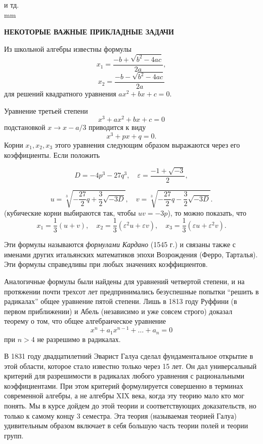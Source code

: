 \documentclass[12pt,english,russian]{article}
\begin{document}
	и тд. \\
	
	 mm
	
	\begin{center}
			{\large {\bf НЕКОТОРЫЕ ВАЖНЫЕ ПРИКЛАДНЫЕ ЗАДАЧИ}  }
		\end{center}
	
	Из школьной алгебры известны формулы
	$$x_1=\frac{-b+\sqrt{b^2-4ac}}{2a},$$
	$$x_2=\frac{-b-\sqrt{b^2-4ac}}{2a}$$ 
	для решений квадратного уравнения $ax^2+bx+c=0$.
	
	Уравнение третьей степени
	$$x^3+ax^2+bx+c=0$$
	подстановкой $x \to x-a/3$ приводится к виду
	$$x^3+px+q=0.$$
	Корни $x_1, x_2, x_3$
	этого уравнения следующим образом выражаются 
	через его коэффициенты. Если положить
	
	$$
		D=-4p^3-27q^3, \quad \varepsilon=\frac{-1+\sqrt{-3}}{2},
	$$
	
	$$
		u=\sqrt[3]{-\frac{27}{2}q+\frac{3}{2}\sqrt{-3D}}, \quad v=\sqrt[3]{-\frac{27}{2}q-\frac{3}{2}\sqrt{-3D}}.
	$$
	(кубические корни выбираются так, чтобы $uv=-3p$), то можно
	показать, что
	$$x_1=\frac{1}{3}(u+v), \quad x_2=\frac{1}{3}(\varepsilon^2u+\varepsilon v), \quad x_3=\frac{1}{3}(\varepsilon u+\varepsilon^2v).$$
	
	Эти формулы называются
	\textit{формулами Кардано}
	(1545 г.) и связаны 
	также с именами других итальянских математиков эпохи
	Возрождения (Ферро, Тарталья). Эти формулы 
	справедливы при
	любых значениях коэффициентов.
	
	Аналогичные формулы были найдены для уравнений четвертой 
	степени, и на протяжении почти трехсот лет предпринимались 
	безуспешные попытки “решить в радикалах” общее уравнение 
	пятой степени. Лишь в 1813 году Руффини (в первом приближении) и Абель (независимо и уже совсем строго) доказал
	теорему о том, что общее алгебраическое уравнение
	$$x^n+a_1x^{n-1}+ \dots +a_n=0$$ при $n > 4$
	не разрешимо в радикалах.

	В 1831 году двадцатилетний Эварист Галуа сделал фундаментальное открытие
	 в этой области, которое стало известно только
	через 15 лет. Он дал универсальный критерий для разрешимости в
	радикалах любого уравнения с рациональными коэффициентами.
	При этом критерий формулируется совершенно в терминах современной алгебры, а не алгебры XIX века, когда эту теорию мало
	кто мог понять. Мы в курсе дойдем до этой теории и соответствующих доказательств, но только к самому концу 3 семестра.
	Эта теория (называемая теорией Галуа) удивительным образом
	включает в себя большую часть теории полей и теории групп.
\end{document}
